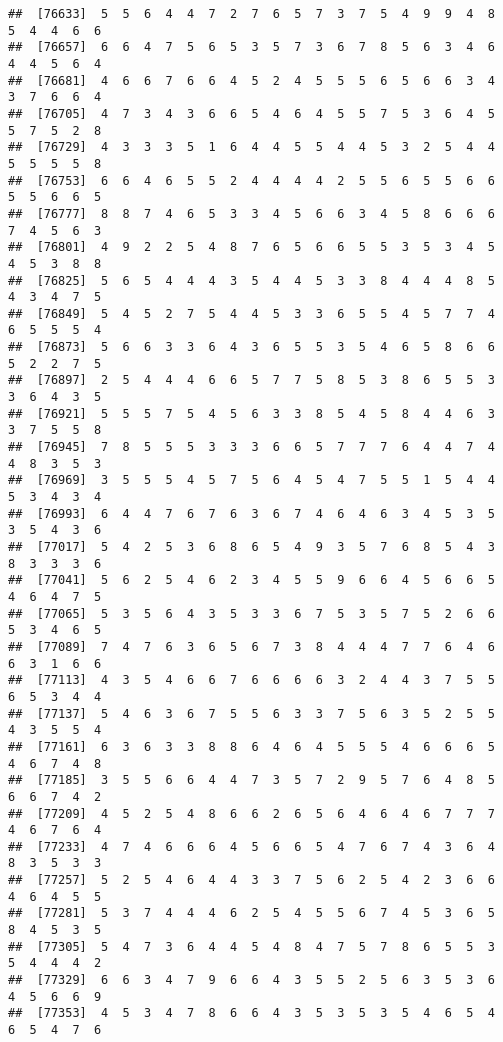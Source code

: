 \documentclass[
]{book}
\begin{document}
\begin{verbatim}
##  [76633]  5  5  6  4  4  7  2  7  6  5  7  3  7  5  4  9  9  4  8  5  4  4  6  6
##  [76657]  6  6  4  7  5  6  5  3  5  7  3  6  7  8  5  6  3  4  6  4  4  5  6  4
##  [76681]  4  6  6  7  6  6  4  5  2  4  5  5  5  6  5  6  6  3  4  3  7  6  6  4
##  [76705]  4  7  3  4  3  6  6  5  4  6  4  5  5  7  5  3  6  4  5  5  7  5  2  8
##  [76729]  4  3  3  3  5  1  6  4  4  5  5  4  4  5  3  2  5  4  4  5  5  5  5  8
##  [76753]  6  6  4  6  5  5  2  4  4  4  4  2  5  5  6  5  5  6  6  5  5  6  6  5
##  [76777]  8  8  7  4  6  5  3  3  4  5  6  6  3  4  5  8  6  6  6  7  4  5  6  3
##  [76801]  4  9  2  2  5  4  8  7  6  5  6  6  5  5  3  5  3  4  5  4  5  3  8  8
##  [76825]  5  6  5  4  4  4  3  5  4  4  5  3  3  8  4  4  4  8  5  4  3  4  7  5
##  [76849]  5  4  5  2  7  5  4  4  5  3  3  6  5  5  4  5  7  7  4  6  5  5  5  4
##  [76873]  5  6  6  3  3  6  4  3  6  5  5  3  5  4  6  5  8  6  6  5  2  2  7  5
##  [76897]  2  5  4  4  4  6  6  5  7  7  5  8  5  3  8  6  5  5  3  3  6  4  3  5
##  [76921]  5  5  5  7  5  4  5  6  3  3  8  5  4  5  8  4  4  6  3  3  7  5  5  8
##  [76945]  7  8  5  5  5  3  3  3  6  6  5  7  7  7  6  4  4  7  4  4  8  3  5  3
##  [76969]  3  5  5  5  4  5  7  5  6  4  5  4  7  5  5  1  5  4  4  5  3  4  3  4
##  [76993]  6  4  4  7  6  7  6  3  6  7  4  6  4  6  3  4  5  3  5  3  5  4  3  6
##  [77017]  5  4  2  5  3  6  8  6  5  4  9  3  5  7  6  8  5  4  3  8  3  3  3  6
##  [77041]  5  6  2  5  4  6  2  3  4  5  5  9  6  6  4  5  6  6  5  4  6  4  7  5
##  [77065]  5  3  5  6  4  3  5  3  3  6  7  5  3  5  7  5  2  6  6  5  3  4  6  5
##  [77089]  7  4  7  6  3  6  5  6  7  3  8  4  4  4  7  7  6  4  6  6  3  1  6  6
##  [77113]  4  3  5  4  6  6  7  6  6  6  6  3  2  4  4  3  7  5  5  6  5  3  4  4
##  [77137]  5  4  6  3  6  7  5  5  6  3  3  7  5  6  3  5  2  5  5  4  3  5  5  4
##  [77161]  6  3  6  3  3  8  8  6  4  6  4  5  5  5  4  6  6  6  5  4  6  7  4  8
##  [77185]  3  5  5  6  6  4  4  7  3  5  7  2  9  5  7  6  4  8  5  6  6  7  4  2
##  [77209]  4  5  2  5  4  8  6  6  2  6  5  6  4  6  4  6  7  7  7  4  6  7  6  4
##  [77233]  4  7  4  6  6  6  4  5  6  6  5  4  7  6  7  4  3  6  4  8  3  5  3  3
##  [77257]  5  2  5  4  6  4  4  3  3  7  5  6  2  5  4  2  3  6  6  4  6  4  5  5
##  [77281]  5  3  7  4  4  4  6  2  5  4  5  5  6  7  4  5  3  6  5  8  4  5  3  5
##  [77305]  5  4  7  3  6  4  4  5  4  8  4  7  5  7  8  6  5  5  3  5  4  4  4  2
##  [77329]  6  6  3  4  7  9  6  6  4  3  5  5  2  5  6  3  5  3  6  4  5  6  6  9
##  [77353]  4  5  3  4  7  8  6  6  4  3  5  3  5  3  5  4  6  5  4  6  5  4  7  6

\end{verbatim}
\end{document}
